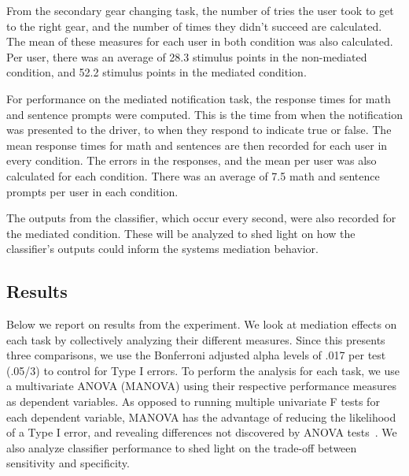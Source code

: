 From the secondary gear changing task, the number of tries the user took to get to the right gear, and the number of times they didn't succeed are calculated. The mean of these measures for each user in both condition was also calculated. Per user, there was an average of 28.3 stimulus points in the non-mediated condition, and 52.2 stimulus points in the mediated condition. 

For performance on the mediated notification task, the response times for math and sentence prompts were computed. This is the time from when the notification was presented to the driver, to when they respond to indicate true or false. The mean response times for math and sentences are then recorded for each user in every condition. The errors in the responses, and the mean per user was also calculated for each condition. There was an average of 7.5 math and sentence prompts per user in each condition. 

The outputs from the classifier, which occur every second, were also recorded for the mediated condition. These will be analyzed to shed light on how the classifier's outputs could inform the systems mediation behavior.

\subsection{Results}
Below we report on results from the experiment. We look at mediation effects on each task by collectively analyzing their different measures. Since this presents three comparisons, we use the Bonferroni adjusted alpha levels of .017 per test (.05/3) to control for Type I errors. To perform the analysis for each task, we use a multivariate ANOVA (MANOVA) using their respective performance measures as dependent variables. As opposed to running multiple univariate F tests for each dependent variable, MANOVA has the advantage of reducing the likelihood of a Type I error, and revealing differences not discovered by ANOVA tests~\cite{warne2014}. We also analyze classifier performance to shed light on the trade-off between sensitivity and specificity.

